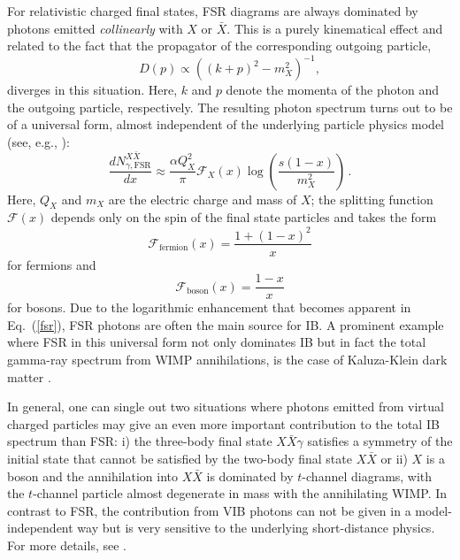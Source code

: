 \documentclass[a4paper,10pt,oneside]{book}
\begin{document}
For relativistic charged final states, FSR diagrams are always dominated by photons 
emitted \emph{collinearly} with $X$ or $\bar X$.  This is a purely kinematical 
effect and related to the fact that the propagator of the corresponding outgoing 
particle,
\begin{equation}
  D(p)\propto\left((k+p)^2-m_X^2\right)^{-1},
\end{equation}
diverges in this situation. Here, $k$ and $p$ denote the momenta of the photon and 
the outgoing particle, respectively. The resulting photon spectrum turns out to be 
of a universal form, almost independent of the underlying particle physics model 
(see, e.g., \cite{Birkedal:2005ep}):
\begin{equation}
  \label{fsr}
  \frac{dN^{X\bar X}_{\gamma,\mathrm{FSR}}}{dx}\approx\frac{\alpha 
Q_X^2}{\pi}\mathcal{F}_X(x)\log \left(\frac{s(1-x)}{m_X^2}\right)\,.
\end{equation}
Here, $Q_X$ and $m_X$ are the electric charge and mass of $X$; the splitting 
function $\mathcal{F}(x)$ depends only on the spin of the final state particles and 
takes the form
\begin{equation}
  \mathcal{F}_\mathrm{fermion}(x)=\frac{1+(1-x)^2}{x}
\end{equation}
for fermions and
\begin{equation}
  \mathcal{F}_\mathrm{boson}(x)=\frac{1-x}{x}
\end{equation}
for bosons. Due to the logarithmic enhancement that becomes apparent in 
Eq.~(\ref{fsr}), FSR photons are often the main source for IB.
A prominent example where FSR in this universal form not only dominates IB but in 
fact the total gamma-ray spectrum from WIMP annihilations, is the case of 
Kaluza-Klein dark matter \cite{Bergstrom:2004cy}.

In general, one can single out two situations where photons emitted from virtual 
charged particles may give an even more important contribution to the total IB 
spectrum than FSR: i) the three-body final state $X\bar X\gamma$ satisfies a 
symmetry of the initial state that cannot be satisfied by the two-body final state 
$X\bar X$ or ii) $X$ is a boson and the annihilation into $X\bar X$ is dominated by 
$t$-channel diagrams, with the $t$-channel particle almost degenerate in mass with 
the annihilating WIMP. In contrast to FSR, the contribution from VIB photons can 
not be given in a model-independent way but is very sensitive to the underlying 
short-distance physics. For more details, see \cite{Bringmann:2007nk}. 
\end{document}
